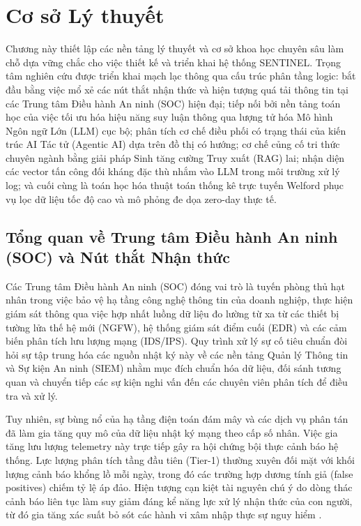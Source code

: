 \chapter{Cơ sở Lý thuyết}
\label{ch:theoretical_background}

Chương này thiết lập các nền tảng lý thuyết và cơ sở khoa học chuyên sâu làm chỗ dựa vững chắc cho việc thiết kế và triển khai hệ thống SENTINEL. Trọng tâm nghiên cứu được triển khai mạch lạc thông qua cấu trúc phân tầng logic: bắt đầu bằng việc mổ xẻ các nút thắt nhận thức và hiện tượng quá tải thông tin tại các Trung tâm Điều hành An ninh (SOC) hiện đại; tiếp nối bởi nền tảng toán học của việc tối ưu hóa hiệu năng suy luận thông qua lượng tử hóa Mô hình Ngôn ngữ Lớn (LLM) cục bộ; phân tích cơ chế điều phối có trạng thái của kiến trúc AI Tác tử (Agentic AI) dựa trên đồ thị có hướng; cơ chế củng cố tri thức chuyên ngành bằng giải pháp Sinh tăng cường Truy xuất (RAG) lai; nhận diện các vector tấn công đối kháng đặc thù nhắm vào LLM trong môi trường xử lý log; và cuối cùng là toán học hóa thuật toán thống kê trực tuyến Welford phục vụ lọc dữ liệu tốc độ cao và mô phỏng đe dọa zero-day thực tế.

\section{Tổng quan về Trung tâm Điều hành An ninh (SOC) và Nút thắt Nhận thức}

Các Trung tâm Điều hành An ninh (SOC) đóng vai trò là tuyến phòng thủ hạt nhân trong việc bảo vệ hạ tầng công nghệ thông tin của doanh nghiệp, thực hiện giám sát thông qua việc hợp nhất luồng dữ liệu đo lường từ xa từ các thiết bị tường lửa thế hệ mới (NGFW), hệ thống giám sát điểm cuối (EDR) và các cảm biến phân tích lưu lượng mạng (IDS/IPS). Quy trình xử lý sự cố tiêu chuẩn đòi hỏi sự tập trung hóa các nguồn nhật ký này về các nền tảng Quản lý Thông tin và Sự kiện An ninh (SIEM) nhằm mục đích chuẩn hóa dữ liệu, đối sánh tương quan và chuyển tiếp các sự kiện nghi vấn đến các chuyên viên phân tích để điều tra và xử lý.

Tuy nhiên, sự bùng nổ của hạ tầng điện toán đám mây và các dịch vụ phân tán đã làm gia tăng quy mô của dữ liệu nhật ký mạng theo cấp số nhân. Việc gia tăng lưu lượng telemetry này trực tiếp gây ra hội chứng bội thực cảnh báo hệ thống. Lực lượng phân tích tầng đầu tiên (Tier-1) thường xuyên đối mặt với khối lượng cảnh báo khổng lồ mỗi ngày, trong đó các trường hợp dương tính giả (false positives) chiếm tỷ lệ áp đảo. Hiện tượng cạn kiệt tài nguyên chú ý do dòng thác cảnh báo liên tục làm suy giảm đáng kể năng lực xử lý nhận thức của con người, từ đó gia tăng xác suất bỏ sót các hành vi xâm nhập thực sự nguy hiểm \cite{alertfatigue2022}.


